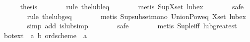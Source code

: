 \begin{isabellebody}
\isanewline
\ \ \ \ \isamarkupfalse%
\ {}thesis\isanewline
\ \ \ \ \ \ \isamarkupfalse%
\ {}rule\ the{}lub{}leq{}\isanewline
\ \ \ \ \ \ \isamarkupfalse%
\ {}metis\ Sup{}X{}set\ lub{}ex{}\isanewline
\ \ \ \ \ \ \isamarkupfalse%
\ safe\isanewline
\ \ \ \ \ \ \isamarkupfalse%
\ {}rule\ the{}lub{}geq{}\isanewline
\ \ \ \ \ \ \isamarkupfalse%
\ {}metis\ Sup{}subset{}mono\ Union{}Pow{}eq\ X{}set\ lub{}ex{}\isanewline
\ \ \ \ \ \ \isamarkupfalse%
\ {}simp\ add{}\ is{}lub{}simp{}\isanewline
\ \ \ \ \ \ \isamarkupfalse%
\ safe\isanewline
\ \ \ \ \ \ \isamarkupfalse%
\ {}metis\ Sup{}le{}iff\ lub{}greatest{}\isanewline
\ \ \isamarkupfalse%
%
\endisatagproof
{\isafoldproof}%
%
\isadelimproof
\isanewline
%
\endisadelimproof
\isanewline
{}\isamarkupfalse%
\isanewline
\isanewline
{}\isamarkupfalse%
\ bot{}ext\ {}{}\ {}{}{}a{}\ {}b{}\ ord{}scheme\ {}\ {}a{}\ {}{}{}\ \isanewline

\end{isabellebody}
